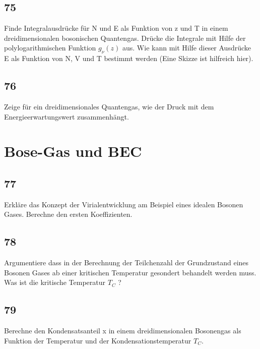 \subsection{75}
\begin{myfrag}
Finde Integralausdrücke für N und E als Funktion von z und T in einem
dreidimensionalen bosonischen Quantengas. Drücke die Integrale mit Hilfe
der polylogarithmischen Funktion $g_\nu (z)$  aus. Wie kann mit Hilfe dieser
Ausdrücke E als Funktion von N, V und T bestimmt werden (Eine Skizze ist
hilfreich hier).
\end{myfrag}
\subsection{76}
\begin{myfrag}
Zeige für ein dreidimensionales Quantengas, wie der Druck mit dem
Energieerwartungswert zusammenhängt.
\end{myfrag}
\section{Bose-Gas und BEC}
\subsection{77}
\begin{myfrag}
Erkläre das Konzept der Virialentwicklung am Beispiel eines idealen
Bosonen Gases. Berechne den ersten Koeffizienten.
\end{myfrag}
\subsection{78}
\begin{myfrag}
Argumentiere dass in der Berechnung der Teilchenzahl der Grundzustand
eines Bosonen Gases ab einer kritischen Temperatur gesondert behandelt
werden muss. Was ist die kritische Temperatur  $T_C$ ?
\end{myfrag}
\subsection{79}
\begin{myfrag}
Berechne den Kondensatsanteil x in einem dreidimensionalen Bosonengas als
Funktion der Temperatur und der Kondensationstemperatur $T_C$.
\end{myfrag}